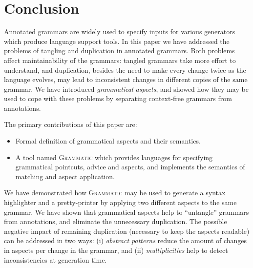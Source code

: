 \documentclass{IOS-Book-Article}     %
\newcommand{\tool}[1]{\textsc{#1}}
\newcommand{\Grammatic}[0]{\tool{Grammatic}}
\begin{document}
%
%
%
%
\section{Conclusion}\label{Conclusion}

Annotated grammars are widely used to specify inputs for various generators which produce language support tools.
In this paper we have addressed the problems of tangling and duplication in annotated grammars. Both problems affect maintainability of the grammars: tangled grammars take more effort to understand, and duplication, besides the need to make every change twice as the language evolves, may lead to inconsistent changes in different copies of the same grammar.
We have introduced \emph{grammatical aspects}, and showed how they may be used to cope with these problems by separating context-free grammars from annotations. 

The primary contributions of this paper are:
\begin{itemize} 
	\item Formal definition of grammatical aspects and their semantics.
	\item A tool named \Grammatic{} which provides languages for specifying grammatical pointcuts, advice and aspects, and implements the semantics of matching and aspect application.
\end{itemize}

We have demonstrated how \Grammatic{} may be used to generate a syntax highlighter and a pretty-printer by applying two different aspects to the same grammar. We have shown that grammatical aspects help to ``untangle'' grammars from annotations, and eliminate the unnecessary duplication. The possible negative impact of remaining duplication (necessary to keep the aspects readable) can be addressed in two ways:
	(i) \emph{abstract patterns} reduce the amount of changes in aspects per change in the grammar, and
	(ii) \emph{multiplicities} help to detect inconsistencies at generation time.
\end{document}

